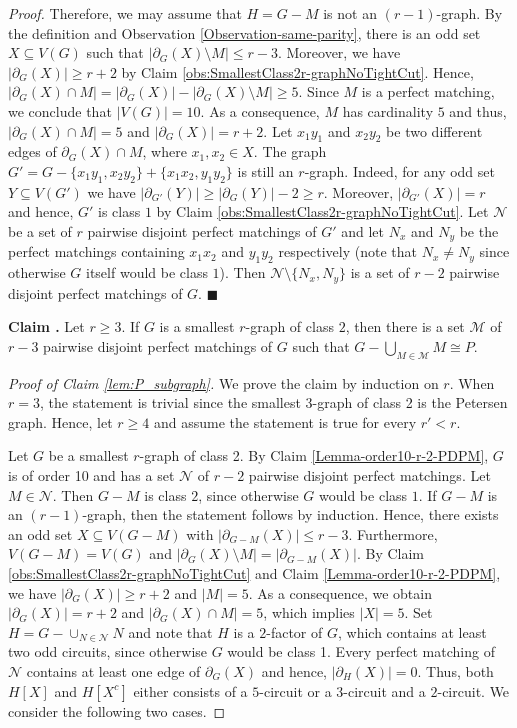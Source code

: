 \documentclass[a4paper,11pt]{article}
\newcommand{\ca}{\mathcal}
\newcounter{claimcount}
\newenvironment{claim}{\refstepcounter{claimcount}\textbf{Claim \arabic{claimcount}.}}{}
\theoremstyle{remark}
\newcommand{\ENDproof}{\hfill $\blacksquare$\medskip\par}
\begin{document}
\begin{proof}
Therefore, we may assume that $H=G-M$ is not an $(r-1)$-graph. 
By the definition and Observation \ref{Observation-same-parity},
there is an odd set $X\subseteq V(G)$ such that $|\partial_G(X)\setminus M|\le r-3$. Moreover, we have $|\partial_G(X)|\ge r+2$ by Claim \ref{obs:SmallestClass2r-graphNoTightCut}. Hence, $|\partial_G(X)\cap M| = |\partial_G(X)| - |\partial_G(X)\setminus M| \ge 5.$ Since $M$ is a perfect matching, we conclude that $|V(G)|=10.$  As a consequence, $M$ has cardinality $5$ and thus, $|\partial_G(X)\cap M|=5$ and $|\partial_G(X)|=r+2.$ Let $x_1y_1$ and $x_2y_2$ be two different edges of $\partial_G(X)\cap M$, where $x_1,x_2\in X$. The graph $G'=G-\{x_1y_1,x_2y_2\} + \{x_1x_2,y_1y_2\}$ is still an $r$-graph. Indeed, for any odd set $Y\subseteq  V(G')$ we have $|\partial_{G'}(Y)| \ge |\partial_G(Y)|-2 \ge r$. Moreover, $|\partial_{G'}(X)| =r$ and hence, $G'$ is class $1$ by Claim \ref{obs:SmallestClass2r-graphNoTightCut}. Let $\ca N$ be a set of $r$ pairwise disjoint perfect matchings of $G'$ and let $N_x$ and $N_y$ be the perfect matchings containing $x_1x_2$ and $y_1y_2$ respectively (note that $N_x\ne N_y$ since otherwise $G$ itself would be class $1$). Then $\ca N \setminus \{N_x,N_y\}$ is a set of $r-2$ pairwise disjoint perfect matchings of $G$.
\ENDproof

\begin{claim}
\label{lem:P_subgraph}
Let $r\ge3$. If $G$ is a smallest $r$-graph of class $2$, then there is a set $\mathcal{M}$ of $r-3$ pairwise disjoint perfect matchings of $G$ such that $G - \bigcup_{M\in \ca M} M \cong P$.
\end{claim}

\emph{Proof of Claim \ref{lem:P_subgraph}.}
We prove the claim by induction on $r$. When $r=3$, the statement is trivial since the smallest $ 3 $-graph of class 2 is the Petersen graph. Hence, let $r\ge 4$ and assume the statement is true for every $r'<r$.

Let $G$ be a smallest $r$-graph of class 2. By Claim \ref{Lemma-order10-r-2-PDPM}, $G$ is of order 10 and has a set $\ca N$ of $r-2$ pairwise disjoint perfect matchings. Let $M \in \ca N$. Then 
$ G-M $ is class $ 2 $, since otherwise $ G $ would be class $ 1 $. If $G-M$ is an $(r-1)$-graph, then the statement follows by induction. Hence, there exists an odd set $X\subseteq V(G-M)$ with $ |\partial_{G-M}(X)| \leq  r-3$. 
Furthermore, $V(G-M)=V(G) $ and $|\partial_G(X)\setminus M| =|\partial_{G-M}(X)| $. By Claim \ref{obs:SmallestClass2r-graphNoTightCut} and Claim \ref{Lemma-order10-r-2-PDPM}, we have $|\partial_G(X)|\geq r+2$ and $ |M|=5 $. As a consequence,  we obtain $|\partial_G(X)|= r+2$ and $|\partial_G(X)\cap M| =  5$, which implies $|X|=5$. Set $H=G - \cup_{N\in \ca N} N$ and note that $H$ is a $2$-factor of $G$, which contains at least two odd circuits, since otherwise $G$ would be class 1. Every perfect matching of $\ca N$ contains at least one edge of $\partial_G(X)$ and hence, $|\partial_H(X)| =  0$. Thus, both $H[X]$ and $H[X^c]$ either consists of a $5$-circuit or a $3$-circuit and a $2$-circuit. We consider the following two cases.
	

\end{proof}
\end{document}
